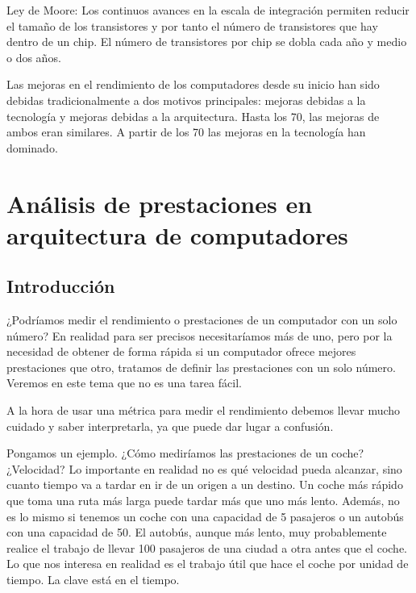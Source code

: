 \documentclass[12pt,onecolumn]{memoir}
\begin{document}
Ley de Moore: Los continuos avances en la escala de integración
permiten reducir el tamaño de los transistores y por tanto el número
de transistores que hay dentro de un chip. El número de transistores
por chip se dobla cada año y medio o dos años.

Las mejoras en el rendimiento de los computadores desde su inicio han
sido debidas tradicionalmente a dos motivos principales: mejoras
debidas a la tecnología y mejoras debidas a la arquitectura. Hasta los
70, las mejoras de ambos eran similares. A partir de los 70 las
mejoras en la tecnología han dominado.




\chapter{Análisis de prestaciones en arquitectura de computadores}
\label{cap:prestaciones}


\section{Introducción}
\label{sec:introduccion_prestaciones}

¿Podríamos medir el rendimiento o prestaciones de un computador con un
solo número? En realidad para ser precisos necesitaríamos más de uno,
pero por la necesidad de obtener de forma rápida si un computador
ofrece mejores prestaciones que otro, tratamos de definir las
prestaciones con un solo número. Veremos en este tema que no es una
tarea fácil.

A la hora de usar una métrica para medir el rendimiento debemos llevar
mucho cuidado y saber interpretarla, ya que puede dar lugar a
confusión.

Pongamos un ejemplo. ¿Cómo mediríamos las prestaciones de un coche?
¿Velocidad? Lo importante en realidad no es qué velocidad pueda
alcanzar, sino cuanto tiempo va a tardar en ir de un origen a un destino. Un
coche más rápido que toma una ruta más larga puede tardar más que uno
más lento. Además, no es lo mismo si tenemos un coche con una
capacidad de 5 pasajeros o un autobús con una capacidad de 50. El
autobús, aunque más lento, muy probablemente realice el trabajo de
llevar 100 pasajeros de una ciudad a otra antes que el coche.
Lo que nos interesa en realidad es el trabajo útil que hace el coche
por unidad de tiempo. La clave está en el tiempo.
\end{document}
